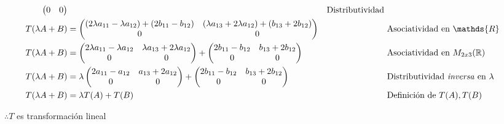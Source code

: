 \documentclass[letterpaper]{article}
\newcommand{\R}{\mathds{R}}
\renewcommand{\*}{\cdot}
\theoremstyle{definition}
\begin{document}
\begin{align*}
\begin{pmatrix}
		0& 0
		\end{pmatrix} && \text{Distributividad } \\
		T(\lambda A + B) &= \begin{pmatrix}
		(2\lambda a_{11} -\lambda a_{12}) + (2b_{11} - b_{12})  &(\lambda a_{13}+ 2\lambda a_{12} )+  (b_{13} + 2b_{12})\\
		0& 0
		\end{pmatrix} && \text{Asociatividad en $ \R $ } \\
		T(\lambda A + B) &= \begin{pmatrix}
		2\lambda a_{11} -\lambda a_{12} & \lambda a_{13}+ 2\lambda a_{12}\\
		0 & 0 
		\end{pmatrix} + \begin{pmatrix}
		2b_{11} - b_{12}  &  b_{13} + 2b_{12}\\
		0& 0
		\end{pmatrix} && \text{Asociatividad en $  M_{2x3}(\mathbb{R}) $ } \\
		T(\lambda A + B) &= \lambda \begin{pmatrix}
		2a_{11} - a_{12} &  a_{13}+ 2 a_{12}\\
		0 & 0 
		\end{pmatrix} + \begin{pmatrix}
		2b_{11} - b_{12}  &  b_{13} + 2b_{12}\\
		0& 0
		\end{pmatrix} && \text{Distributividad \textit{inversa} en $ \lambda $ } \\
		T(\lambda A + B) &= \lambda T(A) + T(B) && \text{Definición de $ T(A), T(B) $ } \\
	\end{align*}
	\begin{center}
		$ \therefore T $ es transformación lineal
	\end{center}	
	
\end{document}
